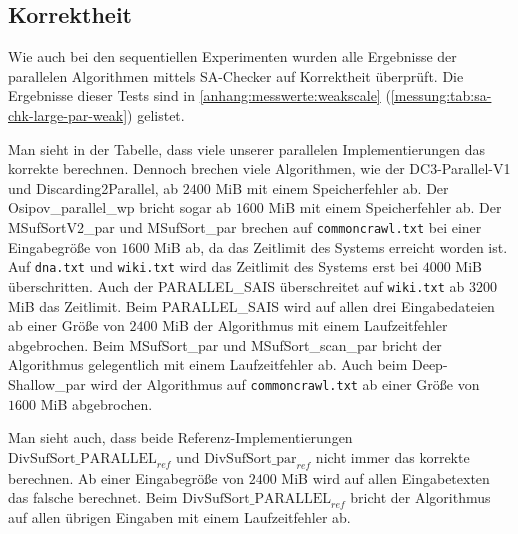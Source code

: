 \subsection{\sa Korrektheit}

Wie auch bei den sequentiellen Experimenten wurden alle Ergebnisse der parallelen Algorithmen mittels SA-Checker auf Korrektheit überprüft.
Die Ergebnisse dieser Tests sind in \cref{anhang:messwerte:weakscale} (\cref{messung:tab:sa-chk-large-par-weak}) gelistet.

Man sieht in der Tabelle, dass viele unserer parallelen Implementierungen das korrekte \sa berechnen. Dennoch brechen viele Algorithmen, wie der DC3-Parallel-V1 und Discarding2Parallel, ab $2400$ MiB mit einem Speicherfehler ab. Der Osipov\_parallel\_wp bricht sogar ab $1600$ MiB mit einem Speicherfehler ab. Der MSufSortV2\_par und MSufSort\_par brechen auf \texttt{commoncrawl.txt} bei einer Eingabegröße von $1600$ MiB ab, da das Zeitlimit des Systems erreicht worden ist. Auf \texttt{dna.txt} und \texttt{wiki.txt} wird das Zeitlimit des Systems erst bei $4000$ MiB überschritten. Auch der PARALLEL\_SAIS überschreitet auf \texttt{wiki.txt} ab $3200$ MiB das Zeitlimit. Beim PARALLEL\_SAIS wird auf allen drei Eingabedateien ab einer Größe von $2400$ MiB der Algorithmus mit einem Laufzeitfehler abgebrochen. Beim MSufSort\_par und MSufSort\_scan\_par bricht der Algorithmus gelegentlich mit einem Laufzeitfehler ab. Auch beim Deep-Shallow\_par wird der Algorithmus auf \texttt{commoncrawl.txt} ab einer Größe von $1600$ MiB abgebrochen. \par
Man sieht auch, dass beide Referenz-Implementierungen $\text{DivSufSort\_PARALLEL}_{ref}$ und $\text{DivSufSort\_par}_{ref}$ nicht immer das korrekte \sa berechnen. Ab einer Eingabegröße von $2400$ MiB wird auf allen Eingabetexten das falsche \sa berechnet. Beim $\text{DivSufSort\_PARALLEL}_{ref}$ bricht der Algorithmus auf allen übrigen Eingaben mit einem Laufzeitfehler ab.
